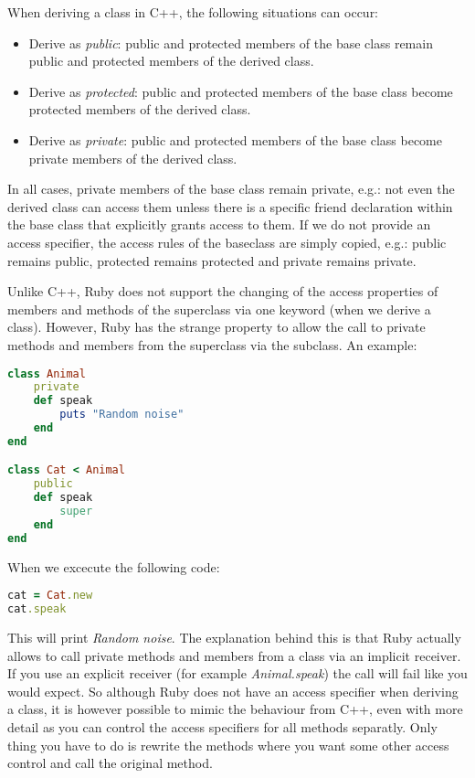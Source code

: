 \documentclass[10pt,a4paper,twocolumn]{article}
\begin{document}
When deriving a class in C++, the following situations can occur:
\begin{itemize}
\item Derive as \textit{public}: public and protected members of the base class remain public and protected members of the derived class.
\item Derive as \textit{protected}: public and protected members of the base class become protected members of the derived class.
\item Derive as \textit{private}: public and protected members of the base class become private members of the derived class.
\end{itemize}
In all cases, private members of the base class remain private, e.g.: not even the derived class can access them unless there is a specific friend declaration within the base class that explicitly grants access to them. If we do not provide an access specifier, the access rules of the baseclass are simply copied, e.g.: public remains public, protected remains protected and private remains private.

Unlike C++, Ruby does not support the changing of the access properties of members and methods of the superclass via one keyword (when we derive a class). However, Ruby has the strange property to allow the call to private methods and members from the superclass via the subclass. An example:

\begin{lstlisting}[language=Ruby]
class Animal
	private
	def speak
		puts "Random noise"
	end
end

class Cat < Animal
	public
	def speak
		super
	end
end
\end{lstlisting}

When we excecute the following code:

\begin{lstlisting}[language=Ruby]
cat = Cat.new
cat.speak
\end{lstlisting}

This will print \textit{Random noise}. The explanation behind this is that Ruby actually allows to call private methods and members from a class via an implicit receiver. If you use an explicit receiver (for example \textit{Animal.speak}) the call will fail like you would expect. So although Ruby does not have an access specifier when deriving a class, it is however possible to mimic the behaviour from C++, even with more detail as you can control the access specifiers for all methods separatly. Only thing you have to do is rewrite the methods where you want some other access control and call the original method.
\end{document}
